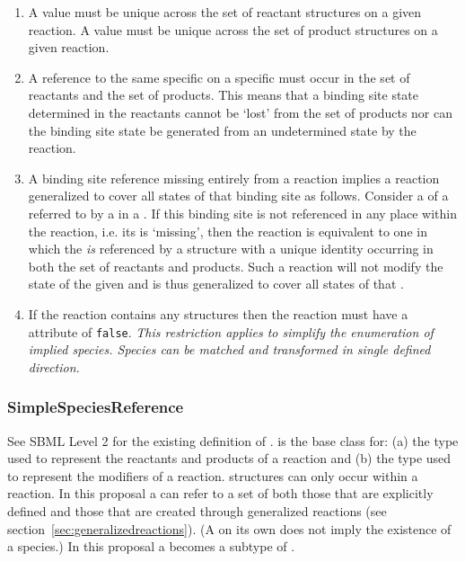 \documentclass{cekarticle}
\begin{document}
\begin{enumerate}

\item A   value must be
unique across the set of reactant 
structures on a given reaction. A 
 value must be unique across the set of product
 structures on a given reaction.

\item A reference to the same specific  on a
specific  must occur in the set of
reactants and the set of products.  This means that a binding site
state determined in the reactants cannot be `lost' from the set of
products nor can the binding site state be generated from an
undetermined state by the reaction.

\item A binding site reference missing entirely from a reaction
implies a reaction generalized to cover all states of that binding
site as follows. Consider a  of a
 referred to by a 
in a .  If this binding site is not referenced in
any place within the reaction, i.e. its is `missing', then the
reaction is equivalent to one in which the 
\emph{is} referenced by a  structure with a
unique identity occurring in both the set of reactants and
products.  Such a reaction will not modify the state of the given
 and is thus generalized to cover all states of
that .

\item If the reaction contains any  structures
then the reaction must have a  attribute of
\texttt{false}. \emph{This restriction applies to simplify the
enumeration of implied species.  Species can be matched and
transformed in single defined direction.}

\end{enumerate}

\subsubsection{SimpleSpeciesReference}

See SBML Level 2 for the existing definition of
.  is
the base class for: (a)  the type used to
represent the reactants and products of a reaction and (b)
 the type used to represent the
modifiers of a reaction.  
structures can only occur within a reaction. In this proposal a
  can refer to a set of
 both those that are explicitly defined and those
that are created through generalized reactions (see
section~\ref{sec:generalizedreactions}).  (A
 on its own does not imply the
existence of a species.) In this proposal a
 becomes a subtype of
.
\end{document}

